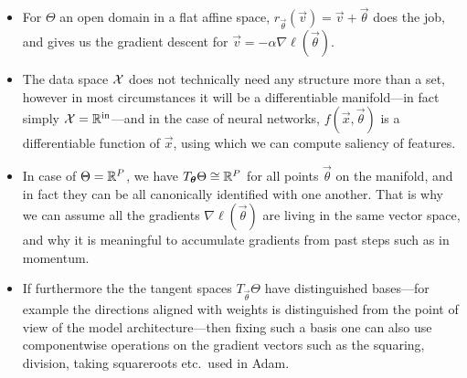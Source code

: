 \documentclass[12pt]{amsart}
\begin{document}
\begin{itemize}
\item For $\Theta$ an open domain in a flat affine space, $r_{\vec{\theta}} (\vec{v}) = \vec{v} + \vec{\theta}$ does the job, and gives us the gradient descent for $\vec{v} = -\alpha \nabla\ell(\vec{\theta})$.
\item The data space $\mathcal{X}$ does not technically need any structure more than a set, however in most circumstances it will be a differentiable manifold---in fact simply $\mathcal{X} = \mathbb{R}^{\text{in}}$---and in the case of neural networks, $f(\vec{x}, \vec{\theta})$ is a differentiable function of $\vec{x}$, using which we can compute saliency of features.
\item In case of $\Theta = \mathbb{R}^P$, we have $T_{\mathbf{\boldsymbol{\theta}}} \Theta \cong \mathbb{R}^P$ for all points $\vec{\theta}$ on the manifold, and in fact they can be all canonically identified with one another. That is why we can assume all the gradients $\nabla \ell(\vec{\theta})$ are living in the same vector space, and why it is meaningful to accumulate gradients from past steps such as in momentum.
\item If furthermore the the tangent spaces $T_{\vec{\theta}}\Theta$ have distinguished bases---for example the directions aligned with weights is distinguished from the point of view of the model architecture---then fixing such a basis one can also use componentwise operations on the gradient vectors such as the squaring, division, taking squareroots etc.\ used in Adam.
\end{itemize}
\end{document}
